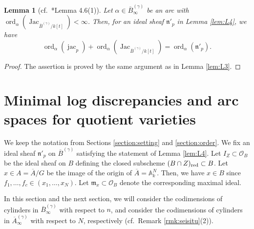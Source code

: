 \documentclass[a4paper,11pt]{amsart}
\newtheorem{lem}[thm]{Lemma}
\theoremstyle{definition}
\theoremstyle{remark}
\begin{document}
\begin{lem}[cf.\ \cite{NS22}*{Lemma 4.6(1)}]\label{lem:L5}
Let $\alpha \in \overline{B}^{(\gamma)} _{\infty}$ be an arc with 
$\operatorname{ord}_{\alpha} \left( \operatorname{Jac} _{\overline{B}^{(\gamma)}/k[t]} \right) < \infty$. 
Then, for an ideal sheaf $\mathfrak{n}'_{p}$ in Lemma \ref{lem:L4}, we have
\[
\operatorname{ord}_{\alpha} \left( \operatorname{jac}_p \right) + \operatorname{ord}_{\alpha} \left( \operatorname{Jac} _{\overline{B}^{(\gamma)}/k[t]} \right)
= \operatorname{ord}_{\alpha} \left( \mathfrak{n}'_{p} \right). 
\]
\end{lem}
\begin{proof}
The assertion is proved by the same argument as in Lemma \ref{lem:L3}. 
\end{proof}


\section{Minimal log discrepancies and arc spaces for quotient varieties}\label{section:mld}
We keep the notation from Sections \ref{section:setting} and \ref{section:order}. 
We fix an ideal sheaf $\mathfrak{n}'_{p}$ on $\overline{B}^{(\gamma)}$ satisfying the statement of Lemma \ref{lem:L4}. 
Let $I_Z \subset \mathcal{O}_B$ be the ideal sheaf on $B$ defining the closed subscheme $(B \cap Z)_{\rm red} \subset B$. 
Let $x \in A = \overline{A}/G$ be the image of the origin of $\overline{A} = \mathbb{A}^N _k$. 
Then, we have $x \in B$ since $f_1, \ldots, f_c \in (x_1, \ldots, x_N)$. 
Let $\mathfrak{m}_x \subset \mathcal{O}_B$ denote the corresponding maximal ideal. 

In this section and the next section, we will consider the codimensions of cylinders in $\overline{B}^{(\gamma)} _{\infty}$ with respect to $n$, 
and consider the codimensions of cylinders in $\overline{A}^{(\gamma)} _{\infty}$ with respect to $N$, respectively (cf.\ Remark \ref{rmk:seisitu}(2)). 
\end{document}
